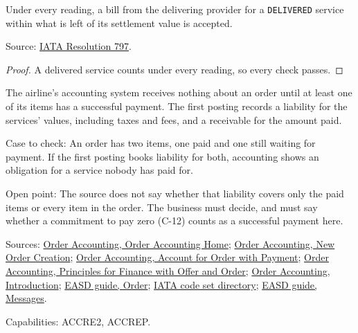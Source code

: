 \begin{theorem}
  \label{thm:accounting-bill-delivered}
  Under every reading, a bill from the delivering provider for a
  \texttt{DELIVERED} service within what is left of its settlement value is
  accepted.

  Source: \href{https://www.iata.org/contentassets/72cbd60393ff42b5975d90ce9e049a7d/oneorder-resolution-797.pdf}{IATA Resolution 797}.
\end{theorem}
\begin{proof}
  A delivered service counts under every reading, so every check passes.
\end{proof}

\begin{theorem}
  \label{thm:accounting-accounting-after-payment}
  \notready
  The airline's accounting system receives nothing about an order until at
  least one of its items has a successful payment. The first posting records
  a liability for the services' values, including taxes and fees, and a
  receivable for the amount paid.

  Case to check: An order has two items, one paid and one still waiting for
  payment. If the first posting books liability for both, accounting shows
  an obligation for a service nobody has paid for.

  Open point: The source does not say whether that liability covers only the
  paid items or every item in the order. The business must decide, and must
  say whether a commitment to pay zero (C-12) counts as a successful payment
  here.

  Sources: \href{https://standards.atlassian.net/wiki/spaces/OA/pages/578912546}{Order Accounting, Order Accounting Home};
  \href{https://standards.atlassian.net/wiki/spaces/OA/pages/578813954}{Order Accounting, New Order Creation};
  \href{https://standards.atlassian.net/wiki/spaces/OA/pages/617185467}{Order Accounting, Account for Order with Payment};
  \href{https://standards.atlassian.net/wiki/spaces/OA/pages/617185366}{Order Accounting, Principles for Finance with Offer and Order};
  \href{https://standards.atlassian.net/wiki/spaces/OA/pages/579010561}{Order Accounting, Introduction};
  \href{https://standards.atlassian.net/wiki/spaces/EASD/pages/574849062/Order}{EASD guide, Order};
  \href{https://standards.atlassian.net/wiki/spaces/AIDM/pages/607420437/View+IATA+Codeset+Directory}{IATA code set directory};
  \href{https://standards.atlassian.net/wiki/spaces/EASD/pages/574652427/Messages}{EASD guide, Messages}.

  Capabilities: ACCRE2, ACCREP.
\end{theorem}

